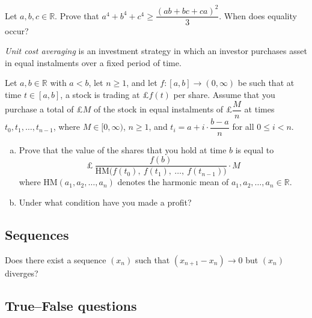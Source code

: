 \begin{chapex}
Let $a,b,c \in \mathbb{R}$. Prove that $a^4 + b^4 + c^4 \ge \dfrac{(ab+bc+ca)^2}{3}$. When does equality occur?
\end{chapex}

\begin{chapex}
\textit{Unit cost averaging} is an investment strategy in which an investor purchases asset in equal instalments over a fixed period of time.

Let $a,b \in \mathbb{R}$ with $a<b$, let $n \ge 1$, and let $f : [a,b] \to (0,\infty)$ be such that at time $t \in [a,b]$, a stock is trading at £$f(t)$ per share. Assume that you purchase a total of £$M$ of the stock in equal instalments of £$\dfrac{M}{n}$ at times $t_0, t_1, \dots, t_{n-1}$, where $M \in [0,\infty)$, $n \ge 1$, and $t_i = a + i \cdot \dfrac{b-a}{n}$ for all $0 \le i < n$.

\begin{enumerate}[(a)]
\item Prove that the value of the shares that you hold at time $b$ is equal to
\[ \text{£}~\dfrac{f(b)}{\mathrm{HM} \big ( f(t_0),~ f(t_1),~ \dots,~ f(t_{n-1}) \big)} \cdot M \]
where $\mathrm{HM}(a_1,a_2,\dots,a_n)$ denotes the harmonic mean of $a_1,a_2,\dots,a_n \in \mathbb{R}$.

\item Under what condition have you made a profit?
\end{enumerate}
\end{chapex}

\subsection*{Sequences}

\begin{chapex}
Does there exist a sequence $(x_n)$ such that $(x_{n+1} - x_n) \to 0$ but $(x_n)$ diverges?
\end{chapex}

\subsection*{True--False questions}


